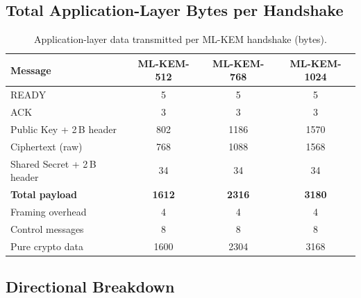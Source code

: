 \documentclass[a4paper,11pt]{article}
\begin{document}
\subsection{Total Application-Layer Bytes per Handshake}

\begin{table}[htbp]
  \centering
  \caption{Application-layer data transmitted per ML-KEM handshake (bytes).}
  \label{tab:mlkem-total}
  \begin{tabular}{@{}lSSS@{}}
    \toprule
    \textbf{Message}
      & {\textbf{ML-KEM-512}} & {\textbf{ML-KEM-768}} & {\textbf{ML-KEM-1024}} \\
    \midrule
    READY                      & 5    & 5    & 5    \\
    ACK                        & 3    & 3    & 3    \\
    Public Key + 2\,B header   & 802  & 1186 & 1570 \\
    Ciphertext (raw)           & 768  & 1088 & 1568 \\
    Shared Secret + 2\,B header& 34   & 34   & 34   \\
    \midrule
    \textbf{Total payload}     & \textbf{1612} & \textbf{2316} & \textbf{3180} \\
    \quad Framing overhead      & 4    & 4    & 4    \\
    \quad Control messages      & 8    & 8    & 8    \\
    \quad Pure crypto data      & 1600 & 2304 & 3168 \\
    \bottomrule
  \end{tabular}
\end{table}

\subsection{Directional Breakdown}
\end{document}
